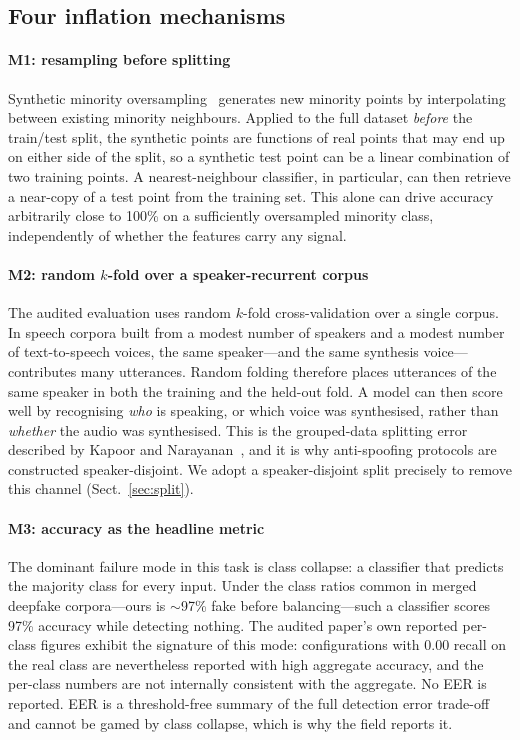 \documentclass[sn-mathphys-num,pdflatex]{sn-jnl}
\begin{document}
\subsection{Four inflation mechanisms}\label{sec:mechanisms}

\paragraph{M1: resampling before splitting}
Synthetic minority oversampling~\cite{smote} generates new minority points by
interpolating between existing minority neighbours. Applied to the full dataset
\emph{before} the train/test split, the synthetic points are functions of real
points that may end up on either side of the split, so a synthetic test point
can be a linear combination of two training points. A nearest-neighbour
classifier, in particular, can then retrieve a near-copy of a test point from the
training set. This alone can drive accuracy arbitrarily close to 100\% on a
sufficiently oversampled minority class, independently of whether the features
carry any signal.

\paragraph{M2: random $k$-fold over a speaker-recurrent corpus}
The audited evaluation uses random $k$-fold cross-validation over a single
corpus. In speech corpora built from a modest number of speakers and a modest
number of text-to-speech voices, the same speaker---and the same
synthesis voice---contributes many utterances. Random folding therefore places
utterances of the same speaker in both the training and the held-out fold. A
model can then score well by recognising \emph{who} is speaking, or which voice
was synthesised, rather than \emph{whether} the audio was synthesised. This is
the grouped-data splitting error described by Kapoor and
Narayanan~\cite{kapoor}, and it is why anti-spoofing protocols are constructed
speaker-disjoint. We adopt a speaker-disjoint split precisely to remove
this channel (Sect.~\ref{sec:split}).

\paragraph{M3: accuracy as the headline metric}
The dominant failure mode in this task is class collapse: a classifier that
predicts the majority class for every input. Under the class ratios common in
merged deepfake corpora---ours is $\sim$97\% fake before balancing---such a
classifier scores 97\% accuracy while detecting nothing. The audited paper's own
reported per-class figures exhibit the signature of this mode: configurations
with 0.00 recall on the real class are nevertheless reported with high aggregate
accuracy, and the per-class numbers are not internally consistent with the
aggregate. No EER is reported. EER is a threshold-free summary of the full
detection error trade-off and cannot be gamed by class collapse, which is why
the field reports it.
\end{document}
